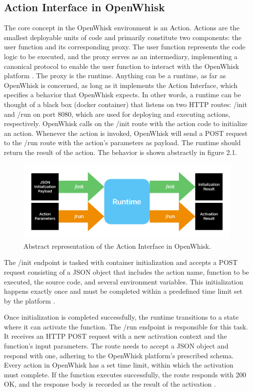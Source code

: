 \subsection{Action Interface in OpenWhisk}
The core concept in the OpenWhisk environment is an Action. Actions are the smallest deployable units of code and primarily constitute two components: the user function and its corresponding proxy. The user function represents the code logic to be executed, and the proxy serves as an intermediary, implementing a canonical protocol to enable the user function to interact with the OpenWhisk platform \cite{action-interface}. The proxy is the runtime. Anything can be a runtime, as far as OpenWhisk is concerned, as long as it implements the Action Interface, which specifies a behavior that OpenWhisk expects. In other words, a runtime can be thought of a black box (docker container) that listens on two HTTP routes: /init and /run on port 8080, which are used for deploying and executing actions, respectively. OpenWhisk calls on the /init route with the action code to initialize an action. Whenever the action is invoked, OpenWhisk will send a POST request  to the /run route with the action's parameters as payload. The runtime should return the result of the action. The behavior is shown abstractly in figure 2.1.
\begin{figure}[h]
    \centering
    \includegraphics[width=\textwidth]{media/action_interface.pdf}
    \caption{Abstract representation of the Action Interface in OpenWhisk.}
    \label{fig:actioninterface}
\end{figure}

The /init endpoint is tasked with container initialization and accepts a POST request consisting of a JSON object that includes the action name, function to be executed, the source code, and several environment variables. This initialization happens exactly once and must be completed within a predefined time limit set by the platform \cite{action-interface}.

Once initialization is completed successfully, the runtime transitions to a state where it can activate the function. The /run endpoint is responsible for this task. It receives an HTTP POST request with a new activation context and the function's input parameters. The route needs to accept a JSON object and respond with one, adhering to the OpenWhisk platform's prescribed schema. Every action in OpenWhisk has a set time limit, within which the activation must complete. If the function executes successfully, the route responds with 200 OK, and the response body is recorded as the result of the activation \cite{openwhisk2023}.

